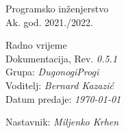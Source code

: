 \documentclass[12pt]{report}
\begin{document}
 
		
		
		
		\begin{titlepage}
			\begin{center}
				\LARGE Programsko inženjerstvo\\
				\large Ak. god. 2021./2022.\\
				
				
				\huge Radno vrijeme\\
				\Large Dokumentacija, Rev. \textit{0.5.1}\\
				
				\normalsize
				Grupa: \textit{DugonogiProgi}\\
				Voditelj: \textit{Bernard Kazazić}\\
				
				
				Datum predaje: \textit{\today}\\
				
				
				Nastavnik: \textit{Miljenko Krhen}\\
				
			\end{center}
			
			
		\end{titlepage}
		
		
		\tableofcontents
		
		
		
		
		
		
		
		
		
		
		\begingroup
		\renewcommand*\listfigurename{Indeks slika i dijagrama}
		\listoffigures
		\endgroup
		
		
		
		\eject 
		
		
		
		
	
\end{document}
